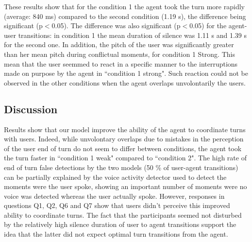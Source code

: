 These results show that for the condition 1 the agent took the turn more rapidly (average: 840 ms) compared to the second condition (1.19 s), the difference being significant (p$<$0.05). The difference was also significant (p$<$0.05) for the agent-user transitions: in condition 1 the mean duration of silence was 1.11 s and 1.39 s for the second one. 
In addition, the pitch of the user was significantly greater than her mean pitch during conflictual moments, for condition 1 Strong. This mean that the user seemmed to react in a specific manner to the interruptions made on purpose by the agent in ``condition 1 strong". Such reaction could not be observed in the other conditions when the agent overlaps unvolontarily the users.



\subsection{Discussion}

Results show that our model improve the ability of the agent to coordinate turns with users. Indeed, while unvolontary overlaps due to mistakes in the perception of the user end of turn do not seem to differ between conditions, the agent took the turn faster in ``condition 1 weak" compared to ``condition 2". The high rate of end of turn false detections by the two models (50 \% of user-agent transitions) can be partially explained by the voice activity detector used to detect the moments were the user spoke, showing an important number of moments were no voice was detected whereas the user actually spoke. 
However, responses in questions Q1, Q2, Q6 and Q7 show that users didn't perceive this improved ability to coordinate turns. The fact that the participants seemed not disturbed by the relatively high silence duration of user to agent transitions support the idea that the latter did not expect optimal turn transitions from the agent.

